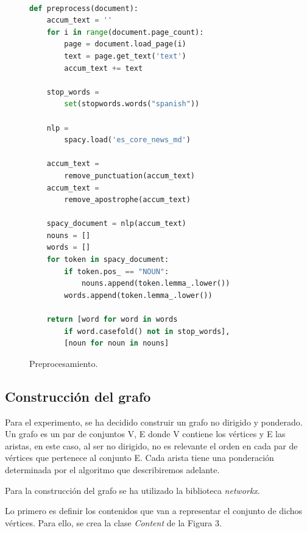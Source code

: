 \documentclass[a4paper,10pt,twocolumn]{article}
\begin{document}
		\begin{figure}[htb]%
			\begin{lstlisting}[language=python]%

def preprocess(document):
    accum_text = ''
    for i in range(document.page_count):
        page = document.load_page(i)
        text = page.get_text('text')
        accum_text += text

    stop_words = 
        set(stopwords.words("spanish"))
    
    nlp = 
        spacy.load('es_core_news_md')

    accum_text = 
        remove_punctuation(accum_text)
    accum_text = 
        remove_apostrophe(accum_text)
    
    spacy_document = nlp(accum_text)
    nouns = []
    words = []
    for token in spacy_document:
        if token.pos_ == "NOUN":
            nouns.append(token.lemma_.lower())
        words.append(token.lemma_.lower())
    
    return [word for word in words 
        if word.casefold() not in stop_words], 
        [noun for noun in nouns]

			\end{lstlisting}
		\caption{Preprocesamiento.\label{fig:code}}
		\end{figure}





            

	\subsection{Construcción del grafo}\label{sub:lists}
 
        Para el experimento, se ha decidido construir un grafo no dirigido y ponderado. Un grafo es un par de conjuntos V, E donde V contiene los vértices y E las aristas, en este caso, al ser no dirigido, no es relevante el orden en cada par de vértices que pertenece al conjunto E. Cada arista tiene una ponderación determinada por el algoritmo que describiremos adelante.

        Para la construcción del grafo se ha utilizado la biblioteca \emph{networkx}.
        
        Lo primero es definir los contenidos que van a representar el conjunto de dichos vértices. Para ello, se crea la clase \emph{Content} de la Figura 3.
\end{document}
